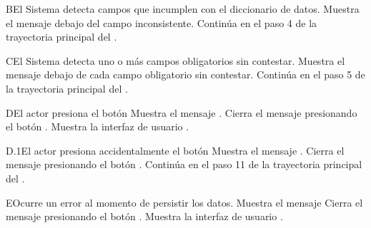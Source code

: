 \begin{UCtrayectoriaA}{B}{El Sistema detecta campos que incumplen con el diccionario de datos.}
    \UCpaso Muestra el mensaje  debajo del campo inconsistente.
    \UCpaso Continúa en el paso 4 de la trayectoria principal del .
\end{UCtrayectoriaA}
\begin{UCtrayectoriaA}{C}{El Sistema detecta uno o más campos obligatorios sin contestar.}
    \UCpaso Muestra el mensaje   debajo de cada campo obligatorio sin contestar.
    \UCpaso Continúa en el paso 5 de la trayectoria principal del .
\end{UCtrayectoriaA}
\begin{UCtrayectoriaA}{D}{El actor presiona el botón }
    \UCpaso Muestra el mensaje .
    \UCpaso[\UCactor] Cierra el mensaje presionando el botón .
    \UCpaso Muestra la interfaz de usuario .
\end{UCtrayectoriaA}
\begin{UCtrayectoriaA}{D.1}{El actor presiona accidentalmente el botón }
    \UCpaso Muestra el mensaje .
    \UCpaso[\UCactor] Cierra el mensaje presionando el botón .
    \UCpaso Continúa en el paso 11 de la trayectoria principal del .
\end{UCtrayectoriaA}
\begin{UCtrayectoriaA}{E}{Ocurre un error al momento de persistir los datos.}
    \UCpaso Muestra el mensaje 
    \UCpaso[\UCactor] Cierra el mensaje presionando el botón .
    \UCpaso Muestra la interfaz de usuario .
\end{UCtrayectoriaA}
